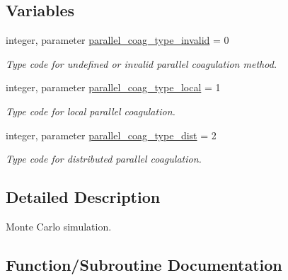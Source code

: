 \subsection*{Variables}
\begin{DoxyCompactItemize}
\item 
integer, parameter \mbox{\hyperlink{namespacepmc__run__part_a278a5ae0d4e066b778b5d58f6a95679c}{parallel\+\_\+coag\+\_\+type\+\_\+invalid}} = 0
\begin{DoxyCompactList}\small\item\em Type code for undefined or invalid parallel coagulation method. \end{DoxyCompactList}\item 
integer, parameter \mbox{\hyperlink{namespacepmc__run__part_a17a6185240300cc792ac0542cfcf0437}{parallel\+\_\+coag\+\_\+type\+\_\+local}} = 1
\begin{DoxyCompactList}\small\item\em Type code for local parallel coagulation. \end{DoxyCompactList}\item 
integer, parameter \mbox{\hyperlink{namespacepmc__run__part_a0225a153cd9f702143b136eee13adc47}{parallel\+\_\+coag\+\_\+type\+\_\+dist}} = 2
\begin{DoxyCompactList}\small\item\em Type code for distributed parallel coagulation. \end{DoxyCompactList}\end{DoxyCompactItemize}


\subsection{Detailed Description}
Monte Carlo simulation. 

\subsection{Function/\+Subroutine Documentation}
\mbox{\label{namespacepmc__run__part_ab2ea939c65074559a8e6f98626ec07b7}} 
